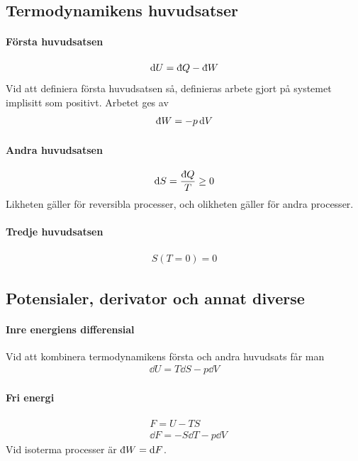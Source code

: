 \subsection{Termodynamikens huvudsatser}

\paragraph{Första huvudsatsen}
\begin{align*}
	\dd{U} = \idd{Q} - \idd{W}
\end{align*}
Vid att definiera första huvudsatsen så, definieras arbete gjort på systemet implisitt som positivt. Arbetet ges av
\begin{align*}
	\idd{W} = -p\dd{V}
\end{align*}

\paragraph{Andra huvudsatsen}
\begin{align*}
	\dd{S} = \frac{\idd{Q}}{T} \geq 0
\end{align*}
Likheten gäller för reversibla processer, och olikheten gäller för andra processer.

\paragraph{Tredje huvudsatsen}
\begin{align*}
	S(T = 0) = 0
\end{align*}

\subsection{Potensialer, derivator och annat diverse}

\paragraph{Inre energiens differensial}
Vid att kombinera termodynamikens första och andra huvudsats får man
\begin{align*}
	\dd{U} = T\dd{S} - p\dd{V}
\end{align*}

\paragraph{Fri energi}
\begin{align*}
	& F = U -TS\\
	& \dd{F} = -S\dd{T} - p\dd{V}
\end{align*}
Vid isoterma processer är $\idd{W} = \dd{F}$.

